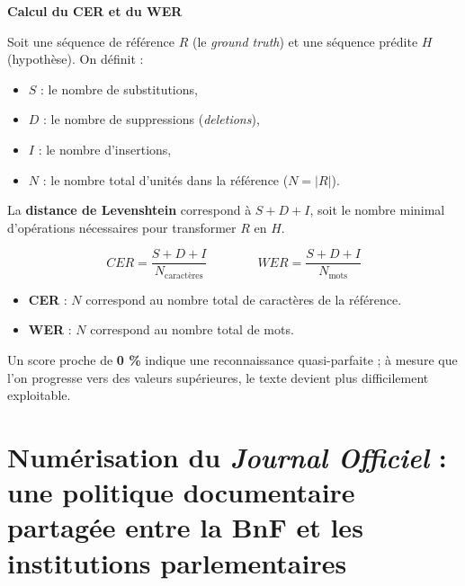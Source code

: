 \begin{encadre}
\textbf{Calcul du CER et du WER}

Soit une séquence de référence $R$ (le \emph{ground truth}) et une séquence prédite $H$ (hypothèse).
On définit :

\begin{itemize}
\item $S$ : le nombre de substitutions,

\item $D$ : le nombre de suppressions (\emph{deletions}),

\item $I$ : le nombre d’insertions,

\item $N$ : le nombre total d’unités dans la référence ($N = |R|$).

\end{itemize}
La \textbf{distance de Levenshtein} correspond à $S + D + I$, soit le nombre minimal d’opérations nécessaires pour transformer $R$ en $H$.

$$
CER = \frac{S + D + I}{N_\text{caractères}}
\qquad\qquad
WER = \frac{S + D + I}{N_\text{mots}}
$$
\begin{itemize}
\item \textbf{CER} : $N$ correspond au nombre total de caractères de la référence.

\item \textbf{WER} : $N$ correspond au nombre total de mots.
\end{itemize}
Un score proche de \textbf{0 \%} indique une reconnaissance quasi-parfaite ; à mesure que l'on progresse vers des valeurs supérieures, le texte devient plus difficilement exploitable.

\end{encadre}
\section{Numérisation du \emph{Journal Officiel} : une politique documentaire partagée entre la BnF et les institutions parlementaires}

